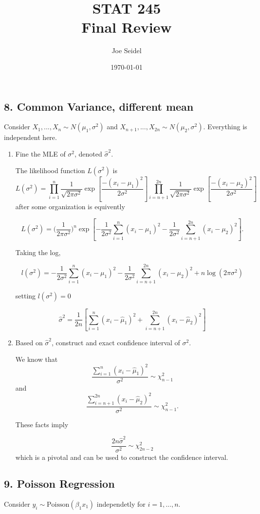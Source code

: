 \documentclass{tufte-book}
\title{STAT  245\\Final Review}
\author{Joe Seidel}
\date{\today}
\begin{document}
\maketitle
{}
\newpage
{}


\subsection{8. Common Variance, different mean}
Consider $X_1,...,X_n \sim N(\mu_1, \sigma^2)$ and $X_{n+1},...,X_{2n} \sim N(\mu_2, \sigma^2)$.  Everything is independent here.

\begin{enumerate}

\item Fine the MLE of $\sigma^2$, denoted $\hat{\sigma}^2$.

The likelihood function $L(\sigma^2)$ is
\[  L(\sigma^2) = \prod_{i=1}^n \frac{1}{\sqrt{2\pi\sigma^2}}\exp[\frac{-(x_i-\mu_1)^2}{2\sigma^2}]\prod_{i=n+1}^{2n} \frac{1}{\sqrt{2\pi\sigma^2}}\exp[\frac{-(x_i-\mu_2)^2}{2\sigma^2}] \]
after some organization is equivently

\[ L(\sigma^2) = \Big(\frac{1}{2\pi\sigma^2}\Big)^n \exp[-\frac{1}{2\sigma^2}\sum_{i=1}^n(x_i-\mu_1)^2 - \frac{1}{2\sigma^2}\sum_{i=n+1}^{2n}(x_i-\mu_2)^2]. \]

Taking the log,

\[ l(\sigma^2) = -\frac{1}{2\sigma^2}\sum_{i=1}^n(x_i-\mu_1)^2 - \frac{1}{2\sigma^2}\sum_{i=n+1}^{2n}(x_i-\mu_2)^2 + n\log(2\pi\sigma^2) \]

setting $l(\sigma^2) = 0$

\[ \hat{\sigma}^2 = \frac{1}{2n}[ \sum_{i=1}^n(x_i - \hat{\mu}_1)^2 + \sum_{i=n+1}^{2n}(x_i-\hat{\mu}_2)^2] \]

\item Based on $\hat{\sigma}^2$, construct and exact confidence interval of $\sigma^2$.

We know that
\[ \frac{\sum_{i=1}^n(x_i - \hat{\mu}_1)^2}{\sigma^2} \sim \chi_{n-1}^2 \]
and
\[ \frac{\sum_{i=n+1}^{2n}(x_i - \hat{\mu}_2)^2}{\sigma^2} \sim \chi_{n-1}^2. \]

These facts imply

\[ \frac{2n\hat{\sigma}^2}{\sigma^2} \sim \chi_{2n-2}^2 \]
which is a pivotal and can be used to construct the confidence interval.

\end{enumerate}

\subsection{9. Poisson Regression}
Consider $y_i \sim \text{Poisson}(\beta_1x_1)$ independetly for $i=1,...,n$.
\end{document}
